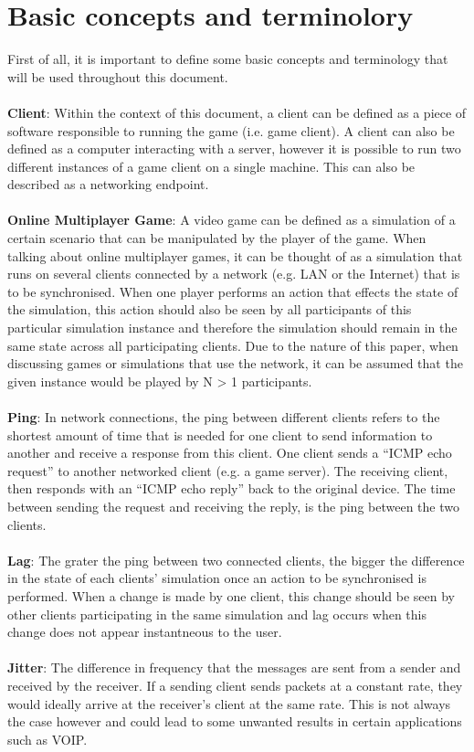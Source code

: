 \section{Basic concepts and terminolory}
First of all, it is important to define some basic concepts and terminology that will be used throughout this document.
\\
\\
\textbf{Client}: Within the context of this document, a client can be defined as a piece of software responsible to running the game (i.e. game client). A client can also be defined as a computer interacting with a server, however it is possible to run two different instances of a game client on a single machine. This can also be described as a networking endpoint.
\\
\\
\textbf{Online Multiplayer Game}: A video game can be defined as a simulation of a certain scenario that can be manipulated by the player of the game. When talking about online multiplayer games, it can be thought of as a simulation that runs on several clients connected by a network (e.g. LAN or the Internet) that is to be synchronised. When one player performs an action that effects the state of the simulation, this action should also be seen by all participants of this particular simulation instance and therefore the simulation should remain in the same state across all participating clients. Due to the nature of this paper, when discussing games or simulations that use the network, it can be assumed that the given instance would be played by N > 1 participants.
\\
\\
\textbf{Ping}: In network connections, the ping between different clients refers to the shortest amount of time that is needed for one client to send information to another and receive a response from this client. One client sends a ``ICMP echo request'' to another networked client (e.g. a game server). The receiving client, then responds with an ``ICMP echo reply'' back to the original device. The time between sending the request and receiving the reply, is the ping between the two clients.
\\
\\
\textbf{Lag}: The grater the ping between two connected clients, the bigger the difference in the state of each clients' simulation once an action to be synchronised is performed. When a change is made by one client, this change should be seen by other clients participating in the same simulation and lag occurs when this change does not appear instantneous to the user.
\\
\\
\textbf{Jitter}: The difference in frequency that the messages are sent from a sender and received by the receiver. If a sending client sends packets at a constant rate, they would ideally arrive at the receiver's client at the same rate. This is not always the case however and could lead to some unwanted results in certain applications such as VOIP.
